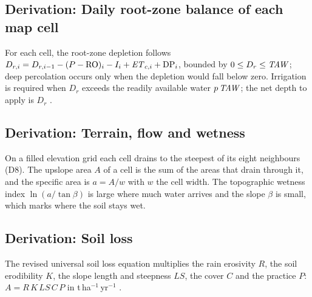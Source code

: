 \subsection{Derivation: Daily root-zone balance of each map cell}\label{der:s3:3}
For each cell, the root-zone depletion follows $D_{r,i}=D_{r,i-1}-(P-\mathrm{RO})_i-I_i+\mathit{ET}_{c,i}+\mathrm{DP}_i$, bounded by $0\le D_{r}\le\mathit{TAW}$; deep percolation occurs only when the depletion would fall below zero. Irrigation is required when $D_r$ exceeds the readily available water $p\,\mathit{TAW}$; the net depth to apply is $D_r$ \citep{Allen1998}.


\subsection{Derivation: Terrain, flow and wetness}\label{der:s3:7}
On a filled elevation grid each cell drains to the steepest of its eight neighbours (D8). The upslope area $A$ of a cell is the sum of the areas that drain through it, and the specific area is $a=A/w$ with $w$ the cell width. The topographic wetness index $\ln(a/\tan\beta)$ is large where much water arrives and the slope $\beta$ is small, which marks where the soil stays wet.


\subsection{Derivation: Soil loss}\label{der:s3:8}
The revised universal soil loss equation multiplies the rain erosivity $R$, the soil erodibility $K$, the slope length and steepness $LS$, the cover $C$ and the practice $P$: $A=R\,K\,LS\,C\,P$ in t\,ha$^{-1}$\,yr$^{-1}$ \citep{Renard1994}.


